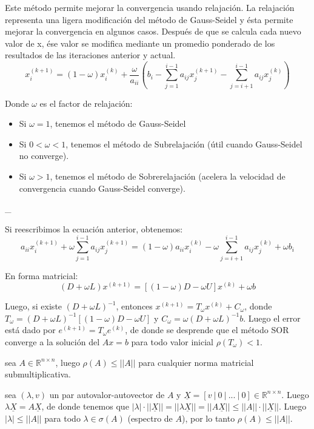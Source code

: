 Este método permite mejorar la convergencia usando relajación. La
relajación representa una ligera modificación del método de Gauss-Seidel
y ésta permite mejorar la convergencia en algunos casos. Después de que
se calcula cada nuevo valor de x, ése valor se modifica mediante un
promedio ponderado de los resultados de las iteraciones anterior y
actual. \[
x_i^{(k+1)} = (1-\omega) x_i^{(k)} 
+ \frac{\omega}{a_{ii}}\left( b_i - \sum_{j=1}^{i-1} a_{ij} x_j^{(k+1)} -
  \sum_{j=i+1}^{i-1} a_{ij} x_j^{(k)} \right) 
\]

Donde \(\omega\) es el factor de relajación:

\begin{itemize}
\tightlist
\item
  Si \(\omega = 1\), tenemos el método de Gauss-Seidel
\item
  Si \(0 < \omega < 1\), tenemos el método de Subrelajación (útil cuando
  Gauss-Seidel no converge).
\item
  Si \(\omega > 1\), tenemos el método de Sobrerelajación (acelera la
  velocidad de convergencia cuando Gauss-Seidel converge).
\end{itemize}

\_

Si reescribimos la ecuación anterior, obtenemos: \[
a_{ii} x_i^{(k+1)} + \omega \sum_{j=1}^{i-1} a_{ij} x_j^{(k+1)} 
= (1-\omega) a_{ii} x_i^{(k)} - \omega \sum_{j=i+1}^{i-1} a_{ij} x_j^{(k)} 
+ \omega b_i
\]

En forma matricial: \[
(D + \omega L)x^{(k+1)} = [(1-\omega) D - \omega U]x^{(k)} + \omega b
\]

Luego, si existe \((D + \omega L)^{-1}\), entonces
\(x^{(k+1)} = T_{\omega} x^{(k)} + C_{\omega}\), donde
\(T_{\omega} = (D + \omega L)^{-1}[(1 - \omega)D - \omega U]\) y
\(C_{\omega} = \omega (D + \omega L)^{-1} b\). Luego el error está dado
por \(e^{(k+1)} = T_{\omega} e^{(k)}\), de donde se desprende que el
método SOR converge a la solución del \(Ax = b\) para todo valor inicial
\sii \(\rho(T_{\omega}) < 1\).

\Teorema sea \(A \in \ensuremath{\mathbb{R}}^{n \times n}\), luego
\(\rho(A) \leq ||A||\) para cualquier norma matricial submultiplicativa.

\Demostracion sea \((\lambda, v)\) un par autovalor-autovector de \(A\)
y
\(\underline{X} = [v\  |\  0\  |\  ...\  |\  0] \in \ensuremath{\mathbb{R}}^{n \times n}\).
Luego \(\lambda \underline{X} = A \underline{X}\), de donde tenemos que
\(|\lambda|\cdot||\underline{X}|| = ||\lambda \underline{X}|| = ||A \underline{X}|| \leq ||A|| \cdot ||\underline{X}||\).
Luego \(|\lambda| \leq||A||\) para todo \(\lambda \in \sigma(A)\)
(espectro de \(A\)), por lo tanto \(\rho(A)\leq|| A ||\).

